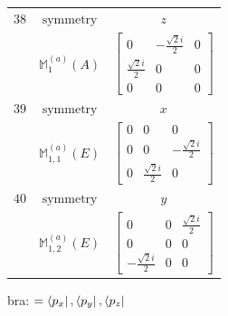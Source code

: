 \documentclass[fleqn,8pt,landscape]{jsarticle}
\begin{document}
\begin{longtable}{ccc}
$ 38 $ & $ \text{symmetry} $ & $ z $ \\
$  $ & $ \mathbb{M}_{1}^{(a)}(A) $ & $ \begin{bmatrix} 0 & - \frac{\sqrt{2} i}{2} & 0 \\ \frac{\sqrt{2} i}{2} & 0 & 0 \\ 0 & 0 & 0 \end{bmatrix} $ \\ \hline
$ 39 $ & $ \text{symmetry} $ & $ x $ \\
$  $ & $ \mathbb{M}_{1,1}^{(a)}(E) $ & $ \begin{bmatrix} 0 & 0 & 0 \\ 0 & 0 & - \frac{\sqrt{2} i}{2} \\ 0 & \frac{\sqrt{2} i}{2} & 0 \end{bmatrix} $ \\ \hline
$ 40 $ & $ \text{symmetry} $ & $ y $ \\
$  $ & $ \mathbb{M}_{1,2}^{(a)}(E) $ & $ \begin{bmatrix} 0 & 0 & \frac{\sqrt{2} i}{2} \\ 0 & 0 & 0 \\ - \frac{\sqrt{2} i}{2} & 0 & 0 \end{bmatrix} $ \\ \hline
\end{longtable}
bra: $=\bra{p_{x}}, \bra{p_{y}}, \bra{p_{z}}$
\end{document}
